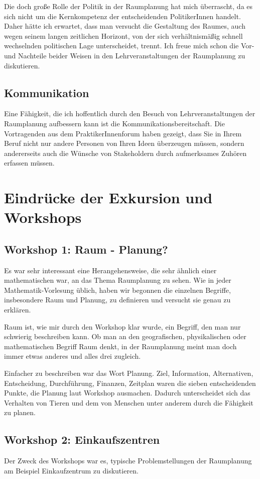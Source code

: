 \documentclass[]{article}
\begin{document}
Die doch große Rolle der Politik in der Raumplanung hat mich überrascht, da es sich nicht um die Kernkompetenz der entscheidenden PolitikerInnen handelt. Daher hätte ich erwartet, dass man versucht die Gestaltung des Raumes, auch wegen seinem langen zeitlichen Horizont, von der sich verhältnismäßig schnell wechselnden politischen Lage unterscheidet, trennt. Ich freue mich schon die Vor- und Nachteile beider Weisen in den Lehrveranstaltungen der Raumplanung zu diskutieren.

\subsection{Kommunikation}
Eine Fähigkeit, die ich hoffentlich durch den Besuch von Lehrveranstaltungen der Raumplanung aufbessern kann ist die Kommunikationsbereitschaft. Die Vortragenden aus dem PraktikerInnenforum haben gezeigt, dass Sie in Ihrem Beruf nicht nur andere Personen von Ihren Ideen überzeugen müssen, sondern andererseits auch die Wünsche von Stakeholdern durch aufmerksames Zuhören erfassen müssen.

\section{Eindrücke der Exkursion und Workshops}
\subsection{Workshop 1: Raum - Planung?}
Es war sehr interessant eine Herangehensweise, die sehr ähnlich einer mathematischen war, an das Thema Raumplanung zu sehen. Wie in jeder Mathematik-Vorlesung üblich, haben wir begonnen die einzelnen Begriffe, insbesondere Raum und Planung, zu definieren und versucht sie genau zu erklären.

Raum ist, wie mir durch den Workshop klar wurde, ein Begriff, den man nur schwierig beschreiben kann. Ob man an den geografischen, physikalischen oder mathematischen Begriff Raum denkt, in der Raumplanung meint man doch immer etwas anderes und alles drei zugleich.

Einfacher zu beschreiben war das Wort Planung. Ziel, Information, Alternativen, Entscheidung, Durchführung, Finanzen, Zeitplan waren die sieben entscheidenden Punkte, die Planung laut Workshop ausmachen. Dadurch unterscheidet sich das Verhalten von Tieren und dem von Menschen unter anderem durch die Fähigkeit zu planen.

\subsection{Workshop 2: Einkaufszentren}
\label{sec:einkaufszentren}
Der Zweck des Workshops war es, typische Problemstellungen der Raumplanung am Beispiel Einkaufzentrum zu diskutieren.
\end{document}
